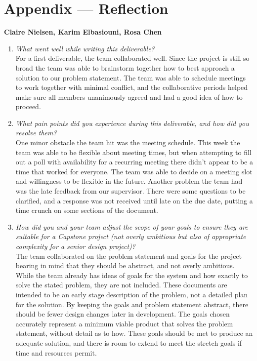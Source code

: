\documentclass{article}
\begin{document}
\newpage{}

\section*{Appendix --- Reflection}

\textbf{Claire Nielsen, Karim Elbasiouni, Rosa Chen}
\begin{enumerate}
    \item \textit{What went well while writing this deliverable?}\\
    For a first deliverable, the team collaborated well. Since the project is still so broad the team was able to brainstorm together how to best approach a solution to our problem statement. The team was able to schedule meetings to work together with minimal conflict, and the collaborative periods helped make sure all members unanimously agreed and had a good idea of how to proceed. 
    \item \textit{What pain points did you experience during this deliverable, and how did you resolve them?}\\
    One minor obstacle the team hit was the meeting schedule. This week the team was able to be flexible about meeting times, but when attempting to fill out a poll with availability for a recurring meeting there didn’t appear to be a time that worked for everyone. The team was able to decide on a meeting slot and willingness to be flexible in the future. Another problem the team had was the late feedback from our supervisor. There were some questions to be clarified, and a response was not received until late on the due date, putting a time crunch on some sections of the document. 
    \item \textit{How did you and your team adjust the scope of your goals to ensure they are suitable for a Capstone project (not overly ambitious but also of appropriate complexity for a senior design project)?}\\
    The team collaborated on the problem statement and goals for the project bearing in mind that they should be abstract, and not overly ambitious. While the team already has ideas of goals for the system and how exactly to solve the stated problem, they are not included. These documents are intended to be an early stage description of the problem, not a detailed plan for the solution. By keeping the goals and problem statement abstract, there should be fewer design changes later in development. The goals chosen accurately represent a minimum viable product that solves the problem statement, without detail as to how. These goals should be met to produce an adequate solution, and there is room to extend to meet the stretch goals if time and resources permit.
\end{enumerate}
\end{document}
